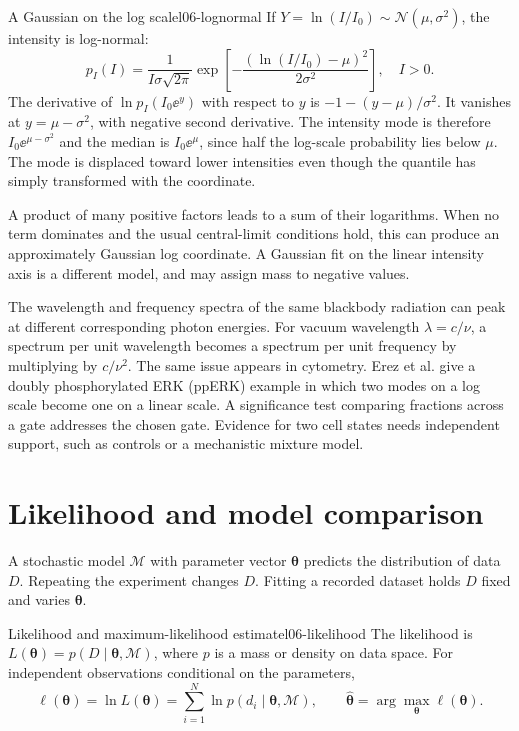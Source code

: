 \begin{example}{A Gaussian on the log scale}{l06-lognormal}
If $Y=\ln(I/I_0)\sim\mathcal N(\mu,\sigma^2)$, the intensity is log-normal:
\begin{equation}
 p_I(I)=\frac{1}{I\sigma\sqrt{2\pi}}
 \exp\left[-\frac{(\ln(I/I_0)-\mu)^2}{2\sigma^2}\right],\quad I>0.
 \label{eq:l06-lognormal}
\end{equation}
The derivative of $\ln p_I(I_0\ee^y)$ with respect to $y$ is $-1-(y-\mu)/\sigma^2$. It vanishes at $y=\mu-\sigma^2$, with negative second derivative. The intensity mode is therefore $I_0\ee^{\mu-\sigma^2}$ and the median is $I_0\ee^\mu$, since half the log-scale probability lies below $\mu$. The mode is displaced toward lower intensities even though the quantile has simply transformed with the coordinate.
\end{example}

A product of many positive factors leads to a sum of their logarithms. When no term dominates and the usual central-limit conditions hold, this can produce an approximately Gaussian log coordinate. A Gaussian fit on the linear intensity axis is a different model, and may assign mass to negative values.

\begin{remark}
The wavelength and frequency spectra of the same blackbody radiation can peak at different corresponding photon energies. For vacuum wavelength $\lambda=c/\nu$, a spectrum per unit wavelength becomes a spectrum per unit frequency by multiplying by $c/\nu^2$. The same issue appears in cytometry. Erez et al. give a doubly phosphorylated ERK (ppERK) example in which two modes on a log scale become one on a linear scale. A significance test comparing fractions across a gate addresses the chosen gate. Evidence for two cell states needs independent support, such as controls or a mechanistic mixture model.
\end{remark}

\section{Likelihood and model comparison}
\label{sec:l06-likelihood}

A stochastic model $\mathcal M$ with parameter vector $\boldsymbol\theta$ predicts the distribution of data $D$. Repeating the experiment changes $D$. Fitting a recorded dataset holds $D$ fixed and varies $\boldsymbol\theta$.

\begin{definition}{Likelihood and maximum-likelihood estimate}{l06-likelihood}
The likelihood is $L(\boldsymbol\theta)=p(D\mid\boldsymbol\theta,\mathcal M)$, where $p$ is a mass or density on data space. For independent observations conditional on the parameters,
\begin{equation}
 \ell(\boldsymbol\theta)=\ln L(\boldsymbol\theta)
 =\sum_{i=1}^{N}\ln p(d_i\mid\boldsymbol\theta,\mathcal M),\qquad
 \widehat{\boldsymbol\theta}=\arg\max_{\boldsymbol\theta}\ell(\boldsymbol\theta).
 \label{eq:l06-log-likelihood}
\end{equation}
\end{definition}

